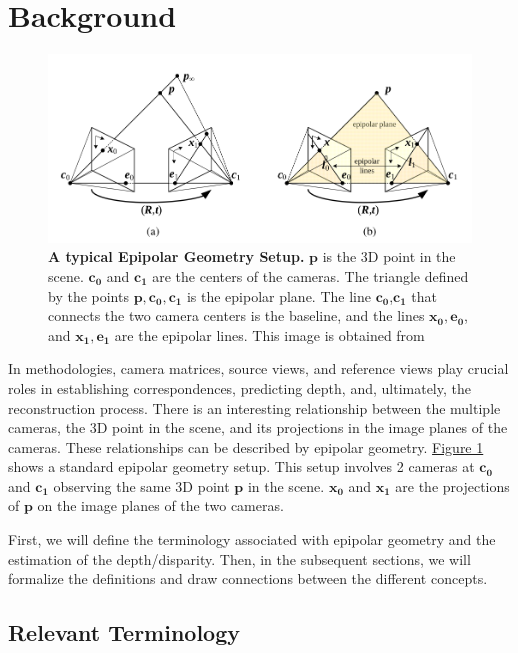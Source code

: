 \chapter{Background}\label{chap:background}
\begin{figure}[ht]
\centering
     \includegraphics[width=1.0\textwidth]{images/epipolar.png}
      \caption[A typical Epipolar Geometry Setup]{\textbf{A typical Epipolar Geometry Setup.} $\mathbf{p}$ is the 3D point in the scene. $\mathbf{c_0}$ and $\mathbf{c_1}$ are the centers of the cameras. The triangle defined by the points $\mathbf{p,c_0,c_1}$ is the epipolar plane. The line $\mathbf{c_0}$,$\mathbf{c_1}$ that connects the two camera centers is the baseline, and the lines $\mathbf{x_0,e_0}$, and $\mathbf{x_1,e_1}$ are the epipolar lines. This image is obtained from \cite{Szeliski2010book}} 
       \label{fig:epipolar}
\end{figure}

In {\mvs} methodologies, camera matrices, source views, and reference views play crucial roles in establishing correspondences, predicting depth, and, ultimately, the reconstruction process.  There is an interesting relationship between the multiple cameras, the 3D point in the scene, and its projections in the image planes of the cameras. These relationships can be described by epipolar geometry.  \hyperref[fig:epipolar]{Figure 1} shows a standard epipolar geometry setup. This setup involves 2 cameras at $\mathbf{c_0}$ and $\mathbf{c_1}$ observing the same 3D point $\mathbf{p}$ in the scene. $\mathbf{x_0}$ and $\mathbf{x_1}$ are the projections of $\mathbf{p}$ on the image planes of the two cameras.\par 
First, we will define the terminology associated with epipolar geometry and the estimation of the depth/disparity. Then, in the subsequent sections, we will formalize the definitions and draw connections between the different concepts. 

\section{Relevant Terminology}

